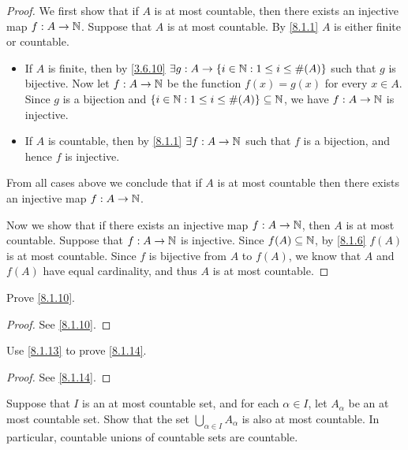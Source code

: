 \begin{proof}
	We first show that if \(A\) is at most countable, then there exists an injective map \(f : A \to \mathbb{N}\).
	Suppose that \(A\) is at most countable.
	By \cref{8.1.1} \(A\) is either finite or countable.
	\begin{itemize}
		\item If \(A\) is finite, then by \cref{3.6.10} \(\exists g : A \to \left\lbrace i \in \mathbb{N} : 1 \leq i \leq \#(A)\right\rbrace\) such that \(g\) is bijective.
		      Now let \(f : A \to \mathbb{N}\) be the function \(f(x) = g(x)\) for every \(x \in A\).
		      Since \(g\) is a bijection and \(\left\lbrace i \in \mathbb{N} : 1 \leq i \leq \#(A)\right\rbrace \subseteq \mathbb{N}\), we have \(f : A \to \mathbb{N}\) is injective.
		\item If \(A\) is countable, then by \cref{8.1.1} \(\exists f : A \to \mathbb{N}\) such that \(f\) is a bijection, and hence \(f\) is injective.
	\end{itemize}
	From all cases above we conclude that if \(A\) is at most countable then there exists an injective map \(f : A \to \mathbb{N}\).

	Now we show that if there exists an injective map \(f : A \to \mathbb{N}\), then \(A\) is at most countable.
	Suppose that \(f : A \to \mathbb{N}\) is injective.
	Since \(f(A) \subseteq \mathbb{N}\), by \cref{8.1.6} \(f(A)\) is at most countable.
	Since \(f\) is bijective from \(A\) to \(f(A)\), we know that \(A\) and \(f(A)\) have equal cardinality, and thus \(A\) is at most countable.
\end{proof}

\begin{ex}\label{ex:8.1.7}
	Prove \cref{8.1.10}.
\end{ex}

\begin{proof}
	See \cref{8.1.10}.
\end{proof}

\begin{ex}\label{ex:8.1.8}
	Use \cref{8.1.13} to prove \cref{8.1.14}.
\end{ex}

\begin{proof}
	See \cref{8.1.14}.
\end{proof}

\begin{ex}\label{ex:8.1.9}
	Suppose that \(I\) is an at most countable set, and for each \(\alpha \in I\), let \(A_{\alpha}\) be an at most countable set.
	Show that the set \(\bigcup_{\alpha \in I} A_{\alpha}\) is also at most countable.
	In particular, countable unions of countable sets are countable.
\end{ex}

